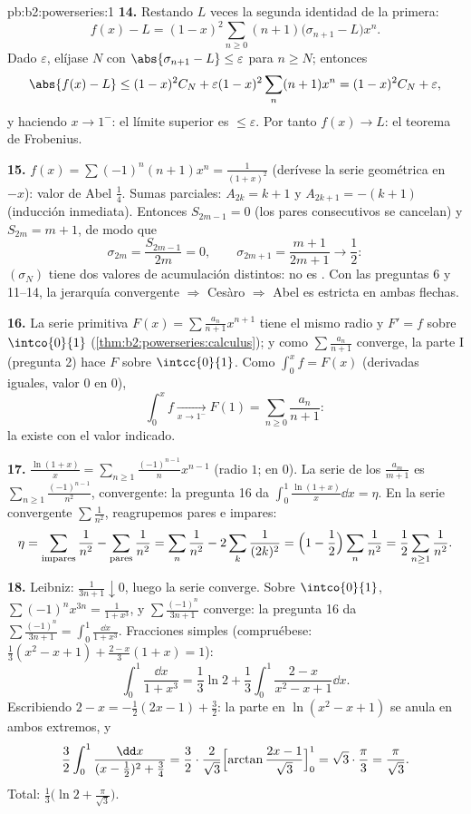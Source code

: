 \begin{solution}{pb:b2:powerseries:1}
\textbf{14.} Restando $L$ veces la segunda identidad de la primera:
\[
f(x) - L = (1-x)^2\sum_{n\geq0}(n+1)
\bigl(\sigma_{n+1} - L\bigr)x^n .
\]
Dado $\varepsilon$, elíjase $N$ con $\abs{\sigma_{n+1} - L} \leq
\varepsilon$ para $n \geq N$; entonces
\[
\abs{f(x) - L} \leq (1-x)^2 C_N +
\varepsilon(1-x)^2\sum_{n}(n+1)x^n
= (1-x)^2C_N + \varepsilon ,
\]
y haciendo $x \to 1^-$: el límite superior es $\leq \varepsilon$.
Por tanto $f(x) \to L$: el teorema de Frobenius.

\textbf{15.} $f(x) = \sum(-1)^n(n+1)x^n = \frac{1}{(1+x)^2}$
(derívese la serie geométrica en $-x$): valor de Abel $\frac14$.
Sumas parciales: $A_{2k} = k+1$ y $A_{2k+1} = -(k+1)$ (inducción
inmediata). Entonces $S_{2m-1} = 0$ (los pares consecutivos se
cancelan) y $S_{2m} = m + 1$, de modo que
\[
\sigma_{2m} = \frac{S_{2m-1}}{2m} = 0,
\qquad
\sigma_{2m+1} = \frac{m+1}{2m+1} \to \frac12 :
\]
$(\sigma_N)$ tiene dos valores de acumulación distintos: no es
. Con las preguntas 6 y 11--14, la jerarquía
convergente $\Rightarrow$ Cesàro $\Rightarrow$ Abel es estricta en
ambas flechas.

\textbf{16.} La serie primitiva $F(x) = \sum\frac{a_n}{n+1}x^{n+1}$
tiene el mismo radio y $F' = f$ sobre $\intco{0}{1}$
(\cref{thm:b2:powerseries:calculus}); y como $\sum\frac{a_n}{n+1}$
converge, la parte I (pregunta 2) hace $F$  sobre
$\intcc{0}{1}$. Como $\int_0^x f = F(x)$ (derivadas iguales, valor
$0$ en $0$),
\[
\int_0^x f \xrightarrow[x\to1^-]{} F(1)
= \sum_{n\geq0}\frac{a_n}{n+1} :
\]
la  existe con el valor indicado.

\textbf{17.} $\frac{\ln(1+x)}{x} =
\sum_{n\geq1}\frac{(-1)^{n-1}}{n}x^{n-1}$ (radio $1$;  en
$0$). La serie de los $\frac{a_m}{m+1}$ es
$\sum_{n\geq1}\frac{(-1)^{n-1}}{n^2}$,  convergente:
la pregunta 16 da $\int_0^1\frac{\ln(1+x)}{x}\dd x = \eta$. En la
serie  convergente $\sum\frac1{n^2}$, reagrupemos pares
e impares:
\[
\eta = \sum_{\text{impares}}\frac1{n^2} -
\sum_{\text{pares}}\frac1{n^2}
= \sum_{n}\frac1{n^2} - 2\sum_{k}\frac1{(2k)^2}
= \Bigl(1 - \frac12\Bigr)\sum_n\frac1{n^2}
= \frac12\sum_{n\geq1}\frac1{n^2} .
\]

\textbf{18.} Leibniz: $\frac{1}{3n+1}\downarrow0$, luego la serie
converge. Sobre $\intco{0}{1}$, $\sum(-1)^nx^{3n} =
\frac{1}{1+x^3}$, y $\sum\frac{(-1)^n}{3n+1}$ converge: la pregunta
16 da $\sum\frac{(-1)^n}{3n+1} = \int_0^1\frac{\dd x}{1+x^3}$.
Fracciones simples (compruébese: $\frac13(x^2-x+1) +
\frac{2-x}{3}(1+x) = 1$):
\[
\int_0^1\frac{\dd x}{1+x^3}
= \frac13\ln2 + \frac13\int_0^1\frac{2-x}{x^2-x+1}\dd x .
\]
Escribiendo $2 - x = -\frac12(2x-1) + \frac32$: la parte en
$\ln(x^2-x+1)$ se anula en ambos extremos, y
\[
\frac32\int_0^1\frac{\dd x}{(x-\frac12)^2 + \frac34}
= \frac32\cdot\frac{2}{\sqrt3}
\Bigl[\arctan\frac{2x-1}{\sqrt3}\Bigr]_0^1
= \sqrt3\cdot\frac{\pi}{3} = \frac{\pi}{\sqrt3} .
\]
Total: $\frac13\bigl(\ln2 + \frac{\pi}{\sqrt3}\bigr)$.


\end{solution}
